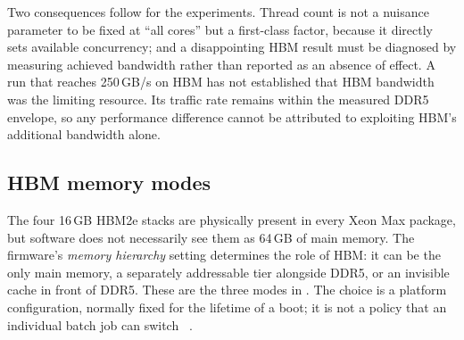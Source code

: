 Two consequences follow for the experiments.  Thread count is not a
nuisance parameter to be fixed at ``all cores'' but a first-class
factor, because it directly sets available concurrency; and a
disappointing HBM result must be diagnosed by measuring achieved
bandwidth rather than reported as an absence of effect.  A run that
reaches 250\,GB/s on HBM has not established that HBM bandwidth was the
limiting resource.  Its traffic rate remains within the measured DDR5
envelope, so any performance difference cannot be attributed to
exploiting HBM's additional bandwidth alone.

\subsection{HBM memory modes}
\label{sec:hbm-modes}

The four 16\,GB HBM2e stacks are physically present in every Xeon Max
package, but software does not necessarily see them as 64\,GB of main
memory.  The firmware's \emph{memory hierarchy} setting determines the
role of HBM: it can be the only main memory, a separately addressable
tier alongside DDR5, or an invisible cache in front of DDR5.  These are
the three modes in .  The choice is a platform
configuration, normally fixed for the lifetime of a boot; it is not a
policy that an individual batch job can switch
~\cite{lp1738,intelmaxtuning}.

